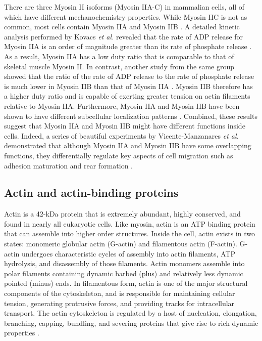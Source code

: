 \documentclass{ucetd}
\begin{document}
There are three Myosin II isoforms (Myosin IIA-C) in mammalian cells, all of which have different mechanochemistry properties.  While Myosin IIC is not as common, most cells contain Myosin IIA and Myosin IIB \cite{VicenteManzanares:2009ik}.  A detailed kinetic analysis performed by Kovacs \textit{et al.} revealed that the rate of ADP release for Myosin IIA is an order of magnitude greater than its rate of phosphate release \cite{Kovacs:2003ex}.  As a result, Myosin IIA has a low duty ratio that is comparable to that of skeletal muscle Myosin II.  In contrast, another study from the same group showed that the ratio of the rate of ADP release to the rate of phosphate release is much lower in Myosin IIB than that of Myosin IIA \cite{Wang:2003dq}.  Myosin IIB therefore has a higher duty ratio and is capable of exerting greater tension on actin filaments relative to Myosin IIA.  Furthermore, Myosin IIA and Myosin IIB have been shown to have different subcellular localization patterns \cite{Kolega:1998um}.  Combined, these results suggest that Myosin IIA and Myosin IIB might have different functions inside cells.  Indeed, a series of beautiful experiments by Vicente-Manzanares \textit{et al.} demonstrated that although Myosin IIA and Myosin IIB have some overlapping functions, they differentially regulate key aspects of cell migration such as adhesion maturation and rear formation \cite{VicenteManzanares:2007ep, VicenteManzanares:2008kj, VicenteManzanares:2011ha}.  




\subsection{Actin and actin-binding proteins} 
Actin is a 42-kDa protein that is extremely abundant, highly conserved, and found in nearly all eukaryotic cells.  Like myosin, actin is an ATP binding protein that can assemble into higher order structures. Inside the cell, actin exists in two states: monomeric globular actin (G-actin) and filamentous actin (F-actin).  G-actin undergoes characteristic cycles of assembly into actin filaments, ATP hydrolysis, and disassembly of those filaments.  Actin monomers assemble into polar filaments containing dynamic barbed (plus) and relatively less dynamic pointed (minus) ends.  In filamentous form, actin is one of the major structural components of the cytoskeleton, and is responsible for maintaining cellular tension, generating protrusive forces, and providing tracks for intracellular transport.  The actin cytoskeleton is regulated by a host of nucleation, elongation, branching, capping, bundling, and severing proteins that give rise to rich dynamic properties \cite{Pollard:2016hj}.
\end{document}
